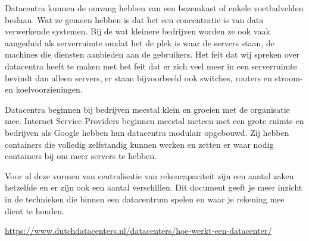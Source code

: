 Datacentra kunnen de omvang hebben van een bezemkast of enkele voetbalvelden beslaan. Wat ze gemeen hebben is dat het een concentratie is van data verwerkende systemen. Bij de wat kleinere bedrijven worden ze ook vaak aangeduid als serverruimte omdat het de plek is waar de servers staan, de machines die diensten aanbieden aan de gebruikers. Het feit dat wij spreken over datacentra heeft te maken met het feit dat er zich veel meer in een serverruimte bevindt dan alleen servers, er staan bijvoorbeeld ook switches, routers en stroom- en koelvoorzieningen.

Datacentra beginnen bij bedrijven meestal klein en groeien met de organisatie mee. Internet Service Providers beginnen meestal meteen met een grote ruimte en bedrijven als Google hebben hun datacentra modulair opgebouwd. Zij hebben containers die volledig zelfstandig kunnen werken en zetten er waar nodig containers bij om meer servers te hebben.

Voor al deze vormen van centralisatie van rekencapaciteit zijn een aantal zaken hetzelfde en er zijn ook een aantal verschillen. Dit document geeft je meer inzicht in de technieken die binnen een datacentrum spelen en waar je rekening mee dient te houden.

\url{https://www.dutchdatacenters.nl/datacenters/hoe-werkt-een-datacenter/}

